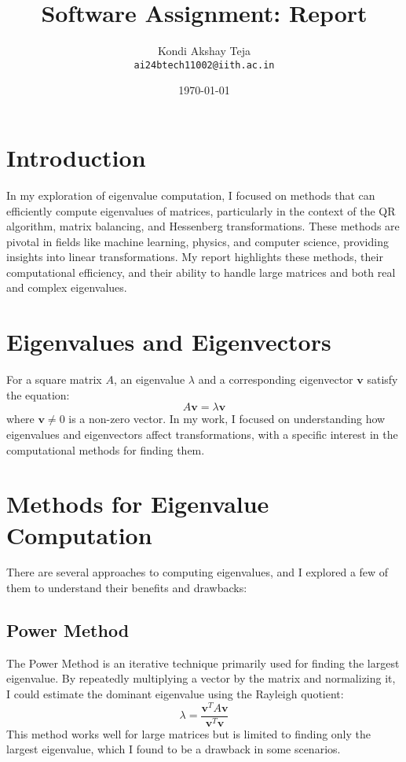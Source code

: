 \documentclass{article}
\title{Software Assignment: Report}
\author{
  Kondi Akshay Teja \\
  \texttt{ai24btech11002@iith.ac.in}
}
\date{\today}
\begin{document}
\maketitle

\section{Introduction}
In my exploration of eigenvalue computation, I focused on methods that can efficiently compute eigenvalues of matrices, particularly in the context of the QR algorithm, matrix balancing, and Hessenberg transformations. These methods are pivotal in fields like machine learning, physics, and computer science, providing insights into linear transformations. My report highlights these methods, their computational efficiency, and their ability to handle large matrices and both real and complex eigenvalues.

\section{Eigenvalues and Eigenvectors}
For a square matrix $ A $, an eigenvalue $ \lambda $ and a corresponding eigenvector $ \mathbf{v} $ satisfy the equation:
$$
A \mathbf{v} = \lambda \mathbf{v}
$$
where $ \mathbf{v} \neq 0 $ is a non-zero vector. In my work, I focused on understanding how eigenvalues and eigenvectors affect transformations, with a specific interest in the computational methods for finding them.

\section{Methods for Eigenvalue Computation}
There are several approaches to computing eigenvalues, and I explored a few of them to understand their benefits and drawbacks:

\subsection{Power Method}
The Power Method is an iterative technique primarily used for finding the largest eigenvalue. By repeatedly multiplying a vector by the matrix and normalizing it, I could estimate the dominant eigenvalue using the Rayleigh quotient:
$$
\lambda = \frac{\mathbf{v}^T A \mathbf{v}}{\mathbf{v}^T \mathbf{v}}
$$
This method works well for large matrices but is limited to finding only the largest eigenvalue, which I found to be a drawback in some scenarios.
\end{document}
